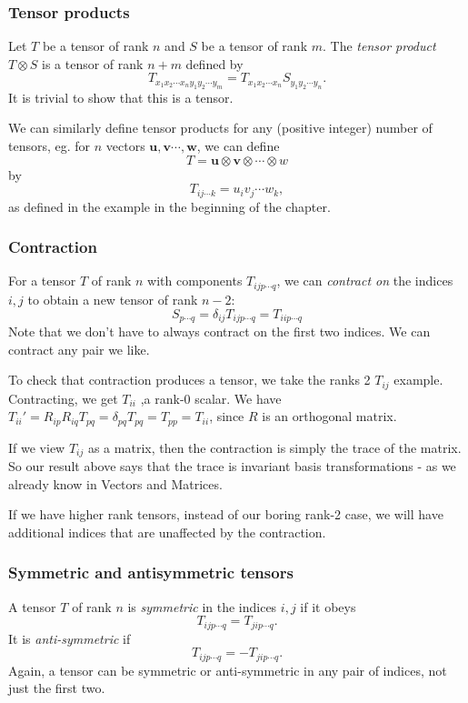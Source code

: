 \documentclass[a4paper]{article}
\begin{document}
\subsubsection{Tensor products}
\begin{defi}
  Let $T$ be a tensor of rank $n$ and $S$ be a tensor of rank $m$. The \emph{tensor product} $T\otimes S$ is a tensor of rank $n + m$ defined by
  \[
    T_{x_1 x_2\cdots x_n y_1y_2\cdots y_m} = T_{x_1x_2\cdots x_n}S_{y_1y_2\cdots y_n}.
  \]
  It is trivial to show that this is a tensor.

  We can similarly define tensor products for any (positive integer) number of tensors, eg. for $n$ vectors $\mathbf{u}, \mathbf{v} \cdots, \mathbf{w}$, we can define
  \[
    T = \mathbf{u}\otimes \mathbf{v}\otimes \cdots \otimes w
  \]
  by
  \[
    T_{ij\cdots k} = u_i v_j \cdots w_k,
  \]
  as defined in the example in the beginning of the chapter.
\end{defi}

\subsubsection{Contraction}
\begin{defi}
  For a tensor $T$ of rank $n$ with components $T_{ijp\cdots q}$, we can \emph{contract on} the indices $i, j$ to obtain a new tensor of rank $n - 2$:
  \[
    S_{p\cdots q} = \delta_{ij}T_{ij p\cdots q} = T_{iip\cdots q}
  \]
  Note that we don't have to always contract on the first two indices. We can contract any pair we like.
\end{defi}
To check that contraction produces a tensor, we take the ranks 2 $T_{ij}$ example. Contracting, we get $T_{ii}$ ,a rank-0 scalar. We have $T_{ii}' = R_{ip}R_{iq}T_{pq} = \delta_{pq}T_{pq} = T_{pp} = T_{ii}$, since $R$ is an orthogonal matrix.

If we view $T_{ij}$ as a matrix, then the contraction is simply the trace of the matrix. So our result above says that the trace is invariant basis transformations - as we already know in Vectors and Matrices.

If we have higher rank tensors, instead of our boring rank-2 case, we will have additional indices that are unaffected by the contraction.
\subsubsection{Symmetric and antisymmetric tensors}
\begin{defi}
  A tensor $T$ of rank $n$ is \emph{symmetric} in the indices $i,j$ if it obeys
  \[
    T_{ijp\cdots q} = T_{jip\cdots q}.
  \]
  It is \emph{anti-symmetric} if
  \[
    T_{ijp\cdots q} = -T_{jip\cdots q}.
  \]
  Again, a tensor can be symmetric or anti-symmetric in any pair of indices, not just the first two.
\end{defi}
\end{document}
